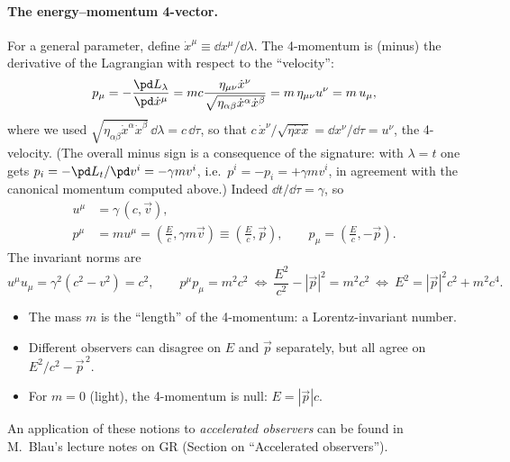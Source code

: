 \paragraph{The energy--momentum 4-vector.} For a general parameter, define $\dot x^\mu\equiv\dd x^\mu/\dd\lambda$. The 4-momentum is (minus) the derivative of the Lagrangian with respect to the ``velocity'':
\begin{equation}
  p_\mu=-\frac{\pd L_\lambda}{\pd\dot x^\mu}=mc\frac{\eta_{\mu\nu}\dot x^\nu}{\sqrt{\eta_{\alpha\beta}\dot x^\alpha\dot x^\beta}}=m\,\eta_{\mu\nu}u^\nu=m\,u_\mu,
\end{equation}
where we used $\sqrt{\eta_{\alpha\beta}\dot x^\alpha\dot x^\beta}\,\dd\lambda=c\,\dd\tau$, so that $c\,\dot x^\nu/\sqrt{\eta\dot x\dot x}=\dd x^\nu/\dd\tau=u^\nu$, the 4-velocity. (The overall minus sign is a consequence of the signature: with $\lambda=t$ one gets $p_i=-\pd L_t/\pd v^i=-\gamma m v^i$, i.e.\ $p^i=-p_i=+\gamma m v^i$, in agreement with the canonical momentum computed above.) Indeed $\dd t/\dd\tau=\gamma$, so
\begin{align}
  u^\mu&=\gamma\,(c,\vec v),\\
  p^\mu&=m u^\mu=\left(\frac Ec,\gamma m\vec v\right)\equiv\left(\frac Ec,\vec p\right),\qquad
  p_\mu=\left(\frac Ec,-\vec p\right).
\end{align}
The invariant norms are
\begin{equation}
  u^\mu u_\mu=\gamma^2(c^2-v^2)=c^2,\qquad
  p^\mu p_\mu=m^2c^2\ \Longleftrightarrow\ \frac{E^2}{c^2}-|\vec p|^2=m^2c^2\ \Longleftrightarrow\ \boxed{E^2=|\vec p|^2c^2+m^2c^4}.
\end{equation}

\begin{remarkbox}
\begin{itemize}[nosep]
  \item The mass $m$ is the ``length'' of the 4-momentum: a Lorentz-invariant number.
  \item Different observers can disagree on $E$ and $\vec p$ separately, but all agree on $E^2/c^2-\vec p^{\,2}$.
  \item For $m=0$ (light), the 4-momentum is null: $E=|\vec p|c$.
\end{itemize}
An application of these notions to \emph{accelerated observers} can be found in M.~Blau's lecture notes on GR (Section on ``Accelerated observers'').
\end{remarkbox}
